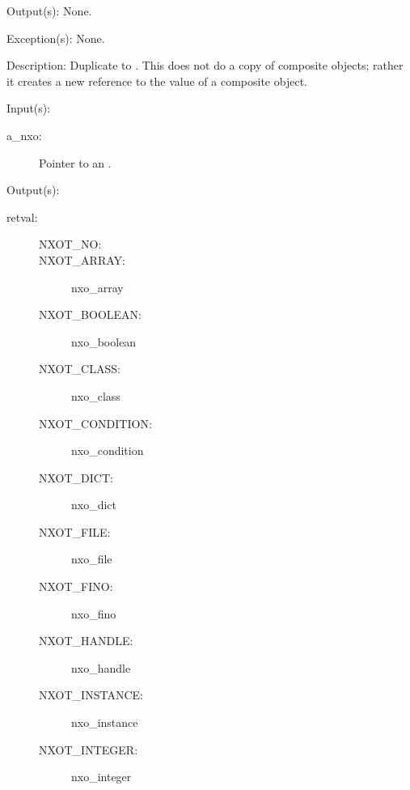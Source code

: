 \begin{capi}
\begin{capilist}
	\item[Output(s): ] None.
	\item[Exception(s): ] None.
	\item[Description: ]
		Duplicate  to .  This does not do a
		copy of composite objects; rather it creates a new reference to
		the value of a composite object.
	\end{capilist}
\label{nxo_type_get}
	\begin{capilist}
	\item[Input(s): ]
		\begin{description}\item[]
		\item[a\_nxo: ]
			Pointer to an .
		\end{description}
	\item[Output(s): ]
		\begin{description}\item[]
		\item[retval: ]
			\begin{description}\item[]
				\item[NXOT\_NO: ]
				\item[NXOT\_ARRAY: ]
					{nxo_array}
				\item[NXOT\_BOOLEAN: ]
					{nxo_boolean}
				\item[NXOT\_CLASS: ]
					{nxo_class}
				\item[NXOT\_CONDITION: ]
					{nxo_condition}
				\item[NXOT\_DICT: ]
					{nxo_dict}
				\item[NXOT\_FILE: ]
					{nxo_file}
				\item[NXOT\_FINO: ]
					{nxo_fino}
				\item[NXOT\_HANDLE: ]
					{nxo_handle}
				\item[NXOT\_INSTANCE: ]
					{nxo_instance}
				\item[NXOT\_INTEGER: ]
					{nxo_integer}

\end{description}
\end{description}
\end{capilist}
\end{capi}
